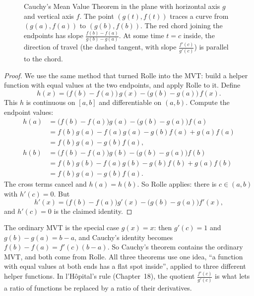 \begin{figure}[H]
\caption{Cauchy's Mean Value Theorem in the plane with horizontal axis $g$ and
vertical axis $f$. The point $(g(t), f(t))$ traces a curve from $(g(a),f(a))$ to
$(g(b),f(b))$. The red chord joining the endpoints has slope
$\frac{f(b)-f(a)}{g(b)-g(a)}$. At some time $t=c$ inside, the direction of travel
(the dashed tangent, with slope $\frac{f'(c)}{g'(c)}$) is parallel to the chord.}
\label{ch15:fig-cauchy}
\end{figure}

\begin{proof}
We use the same method that turned Rolle into the MVT: build a helper function with
equal values at the two endpoints, and apply Rolle to it. Define
\[
  h(x)=\bigl(f(b)-f(a)\bigr)\,g(x)-\bigl(g(b)-g(a)\bigr)\,f(x).
\]
This $h$ is continuous on $[a,b]$ and differentiable on $(a,b)$. Compute the
endpoint values:
\begin{align*}
  h(a)&=\bigl(f(b)-f(a)\bigr)g(a)-\bigl(g(b)-g(a)\bigr)f(a)\\
      &=f(b)g(a)-f(a)g(a)-g(b)f(a)+g(a)f(a)\\
      &=f(b)g(a)-g(b)f(a),\\[4pt]
  h(b)&=\bigl(f(b)-f(a)\bigr)g(b)-\bigl(g(b)-g(a)\bigr)f(b)\\
      &=f(b)g(b)-f(a)g(b)-g(b)f(b)+g(a)f(b)\\
      &=f(b)g(a)-g(b)f(a).
\end{align*}
The cross terms cancel and $h(a)=h(b)$. So Rolle applies: there is $c\in(a,b)$ with
$h'(c)=0$. But
\[
  h'(x)=\bigl(f(b)-f(a)\bigr)g'(x)-\bigl(g(b)-g(a)\bigr)f'(x),
\]
and $h'(c)=0$ is the claimed identity.
\end{proof}

\begin{connectionbox}
The ordinary MVT is the special case $g(x)=x$: then $g'(c)=1$ and
$g(b)-g(a)=b-a$, and Cauchy's identity becomes
$f(b)-f(a)=f'(c)(b-a)$. So Cauchy's theorem contains the ordinary MVT, and
both come from Rolle. All three theorems use one idea, ``a function with equal values
at both ends has a flat spot inside'', applied to three different helper
functions. In l'H\^opital's rule (Chapter~18), the
quotient $\frac{f'(c)}{g'(c)}$ is what lets a ratio of functions be
replaced by a ratio of their derivatives.
\end{connectionbox}


